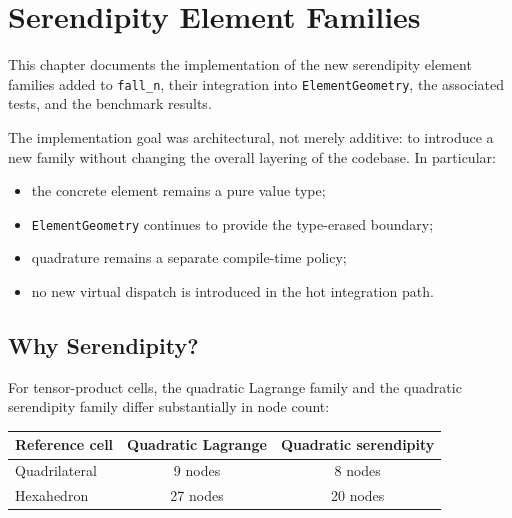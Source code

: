 
\chapter{Serendipity Element Families}
\label{ch:serendipity}

This chapter documents the implementation of the new serendipity element
families added to \texttt{fall\_n}, their integration into
\texttt{ElementGeometry}, the associated tests, and the benchmark results.

The implementation goal was architectural, not merely additive:
to introduce a new family without changing the overall layering of the codebase.
In particular:

\begin{itemize}[nosep]
  \item the concrete element remains a pure value type;
  \item \texttt{ElementGeometry} continues to provide the type-erased boundary;
  \item quadrature remains a separate compile-time policy;
  \item no new virtual dispatch is introduced in the hot integration path.
\end{itemize}


\section{Why Serendipity?}
\label{sec:serendipity_why}

For tensor-product cells, the quadratic Lagrange family and the quadratic
serendipity family differ substantially in node count:

\begin{center}
\begin{tabular}{lcc}
  \toprule
  Reference cell & Quadratic Lagrange & Quadratic serendipity \\
  \midrule
  Quadrilateral & 9 nodes  & 8 nodes \\
  Hexahedron    & 27 nodes & 20 nodes \\
  \bottomrule
\end{tabular}
\end{center}


